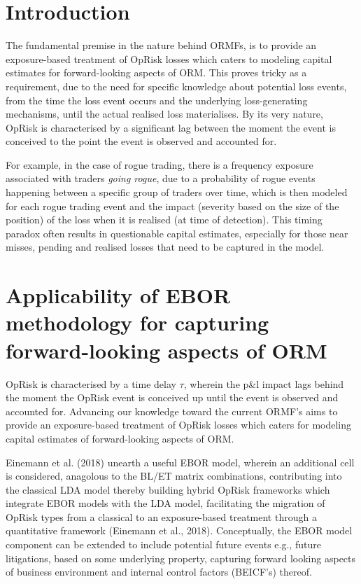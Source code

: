 \documentclass{DissertateUSU}
\begin{document}
\doublespacing

\section{Introduction}
\label{sec3:Introduction}

The fundamental premise in the nature behind ORMFs, is to provide an
exposure-based treatment of OpRisk losses which caters to modeling
capital estimates for forward-looking aspects of ORM. This proves tricky
as a requirement, due to the need for specific knowledge about potential
loss events, from the time the loss event occurs and the underlying
loss-generating mechanisms, until the actual realised loss materialises.
By its very nature, OpRisk is characterised by a significant lag between
the moment the event is conceived to the point the event is observed and
accounted for.\medskip 

For example, in the case of rogue trading, there is a frequency exposure
associated with traders \emph{going rogue}, due to a probability of
rogue events happening between a specific group of traders over time,
which is then modeled for each rogue trading event and the impact
(severity based on the size of the position) of the loss when it is
realised (at time of detection). This timing paradox often results in
questionable capital estimates, especially for those near misses,
pending and realised losses that need to be captured in the model.

\section{Applicability of EBOR methodology for capturing forward-looking aspects of ORM}
\label{sec:Applicability of EBOR methodology for capturing forward-looking aspects of ORM}

OpRisk is characterised by a time delay \(\tau\), wherein the p\&l
impact lags behind the moment the OpRisk event is conceived up until the
event is observed and accounted for. Advancing our knowledge toward the
current ORMF's aims to provide an exposure-based treatment of OpRisk
losses which caters for modeling capital estimates of forward-looking
aspects of ORM.\medskip

Einemann et al. (2018) unearth a useful EBOR model, wherein an
additional cell is considered, anagolous to the BL/ET matrix
combinations, contributing into the classical LDA model thereby building
hybrid OpRisk frameworks which integrate EBOR models with the LDA model,
facilitating the migration of OpRisk types from a classical to an
exposure-based treatment through a quantitative framework (Einemann et
al., 2018). Conceptually, the EBOR model component can be extended to
include potential future events e.g., future litigations, based on some
underlying property, capturing forward looking aspects of business
environment and internal control factors (BEICF's) thereof.\medskip
\end{document}
